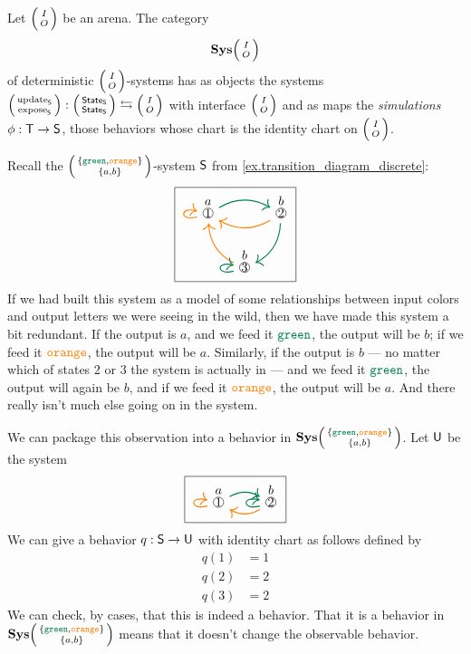 \documentclass[DynamicalBook]{subfiles}
\begin{document}
\begin{definition}\label{def.cat_of_systems_discrete}
  Let $\lens{I}{O}$ be an arena. The category
$$\Cat{Sys}\lens{I}{O}$$
of deterministic $\lens{I}{O}$-systems has as objects the systems
$\lens{\update{S}}{\expose{S}} : \lens{\State{S}}{\State{S}} \fromto
\lens{I}{O}$ with interface $\lens{I}{O}$ and as maps the \emph{simulations} $\phi :
\mathsf{T} \to \mathsf{S}$, those behaviors whose chart is the identity chart on $\lens{I}{O}$.
\end{definition}

\begin{example}\label{ex.simulation_discrete}
  Recall the $\lens{\{\Green, \Orange\}}{\{a, b\}}$-system $\mathsf{S}$ from
  \cref{ex.transition_diagram_discrete}:
 \[
\begin{tikzpicture}
	\node[draw] {
  \begin{tikzcd}[column sep=small]
  	\LMOO{1}{a}\ar[rr, dgreen, thick, bend left]\ar[loop left, thick, orange]&&
  	\LMOO{2}{b}\ar[ll, thick, orange, bend left]\ar[dl, bend left, thick, dgreen]\\&
  	\LMOO{3}{b} \ar[ul, thick, orange, bend left] \ar[loop left, thick, dgreen]
  \end{tikzcd}
  };
\end{tikzpicture}
\]
 If we had built this system as a model of some relationships between input
 colors and output letters we were seeing in the wild, then we have made this
 system a bit redundant. If the output is $a$, and we feed it $\Green$, the
 output will be $b$; if we feed it ${\color{orange} \mathtt{orange}}$, the output will be $a$. Similarly,
 if the output is $b$ --- no matter which of states $2$ or $3$ the system
 is actually in --- and we feed it $\Green$, the output will again be $b$, and
 if we feed it ${\color{orange} \mathtt{orange}}$, the output will be $a$. And there really isn't much
 else going on in the system.

 We can package this observation into a behavior in $\Cat{Sys}\lens{\{\Green,
   \Orange\}}{\{a, b\}}$. Let $\mathsf{U}$ be the system
 \[
\begin{tikzpicture}
	\node[draw] {
  \begin{tikzcd}[column sep=small]
  	\LMOO{1}{a}\ar[rr, dgreen, thick, bend left]\ar[loop left, thick, orange]&&
  	\LMOO{2}{b}\ar[ll, thick, orange, bend left]\ar[loop left, thick, dgreen]
  \end{tikzcd}
  };
\end{tikzpicture}
\]
We can give a behavior $q : \mathsf{S} \to \mathsf{U}$ with identity chart as follows
defined by
\begin{align*}
  q(1) &= 1 \\
  q(2) &= 2 \\
  q(3) &= 2
\end{align*}
We can check, by cases, that this is indeed a behavior. That it is a behavior in
$\Cat{Sys}\lens{\{\Green, \Orange\}}{\{a, b\}}$ means that it doesn't change the
observable behavior.
\end{example}
\end{document}
